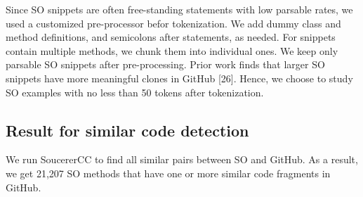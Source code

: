 Since SO snippets are often free-standing statements with low parsable rates, we used a customized pre-processor befor tokenization. We add dummy class and method definitions, and semicolons after statements, as needed. For snippets contain multiple methods, we chunk them into individual ones. We keep only parsable SO snippets after pre-processing. Prior work finds that larger SO snippets have more meaningful clones in GitHub [26]. Hence, we choose to study SO examples with no less than 50 tokens after tokenization.

\subsection{Result for similar code detection}
We run SoucererCC to find all similar pairs between SO and GitHub. As a result, we get 21,207 SO methods that have one or more similar code fragments in GitHub.
